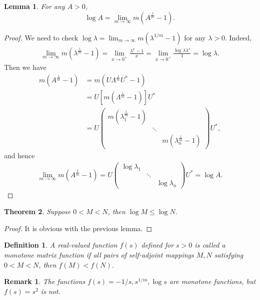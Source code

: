 \documentclass[11pt]{book}
\newtheorem{definition}{Definition}[section]
\newtheorem{theorem}{Theorem}[section]
\newtheorem{lemma}[theorem]{Lemma}
\newtheorem{remark}{Remark}[section]
\theoremstyle{definition}
\numberwithin{equation}{chapter}
\begin{document}
\begin{lemma}
For any $A > 0$, $$\log A = \lim_{m\to\infty} m \left(A^{\frac{1}{m}} - 1\right).$$
\end{lemma}
\begin{proof}
We need to check $\log \lambda = \lim_{m\to\infty} m \left(\lambda^{1/m} - 1\right)$ for any $\lambda > 0$. Indeed, 
\begin{align*}
    \lim_{m\to\infty} m \left(\lambda^{\frac{1}{m}} - 1\right) = \lim_{x\to 0^+} \frac{\lambda^x - 1}{x} = \lim_{x\to 0^+} \frac{\log \lambda \lambda^x}{1} = \log \lambda. 
\end{align*}
Then we have
\begin{align*}
    m \left(A^{\frac{1}{m}} - 1\right) & = m \left( U \Lambda^{\frac{1}{m}} U^* - 1 \right) \\
    & = U \left[m \left(\Lambda^{\frac{1}{m}} - 1\right)\right] U^* \\
    & = U \begin{pmatrix}
        m \left(\lambda_1^{\frac{1}{m}} - 1\right) &  & \\
        & \ddots & \\
        &  & m \left(\lambda_n^{\frac{1}{m}} - 1\right)
    \end{pmatrix} U^*,
\end{align*}
and hence 
\begin{align*}
    \lim_{m\to\infty} m \left(A^{\frac{1}{m}} - 1\right) = U \begin{pmatrix}
        \log \lambda_1 &  & \\
        & \ddots & \\
        &  & \log \lambda_n
    \end{pmatrix} U^* = \log A.
\end{align*}
\end{proof}

\medskip

\begin{theorem}
Suppose $0 < M < N$, then $\log M \leq \log N$.
\end{theorem}
\begin{proof}
It is obvious with the previous lemma.
\end{proof}

\medskip

\begin{definition}
A real-valued function $f(s)$ defined for $s > 0$ is called a monotone matrix function if all pairs of self-adjoint mappings $M, N$ satisfying $0 < M < N$, then $f(M) < f(N)$. 
\end{definition}
\begin{remark}
The functions $f(s) = - 1/s, s^{1/m}, \log s$ are monotone functions, but $f(s) = s^2$ is not.
\end{remark}
\end{document}
